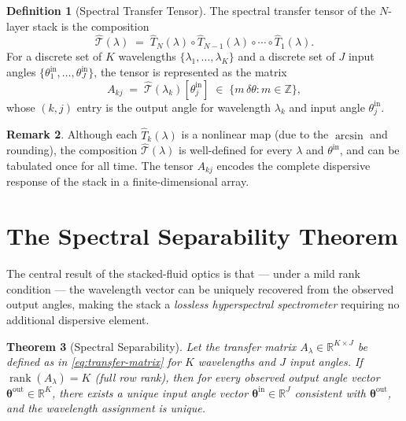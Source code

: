 \documentclass[11pt,twocolumn,a4paper]{article}
\theoremstyle{plain}
\newtheorem{theorem}{Theorem}[section]
\theoremstyle{definition}
\newtheorem{definition}[theorem]{Definition}
\newtheorem{remark}[theorem]{Remark}
\theoremstyle{remark}
\DeclareMathOperator{\rank}{rank}
\newcommand{\R}{\mathbb{R}}
\newcommand{\Z}{\mathbb{Z}}
\begin{document}
\begin{definition}[Spectral Transfer Tensor]
\label{def:transfer-tensor}
The spectral transfer tensor of the $N$-layer stack is the composition
\begin{equation}
\label{eq:transfer-tensor}
  \hat{\mathcal{T}}(\lambda) \;=\; \hat{T}_N(\lambda)\circ\hat{T}_{N-1}(\lambda)\circ\cdots\circ\hat{T}_1(\lambda).
\end{equation}
For a discrete set of $K$ wavelengths $\{\lambda_1,\ldots,\lambda_K\}$ and a discrete set of $J$ input angles $\{\theta_1^\text{in},\ldots,\theta_J^\text{in}\}$, the tensor is represented as the matrix
\begin{equation}
\label{eq:transfer-matrix}
  A_{kj} \;=\; \hat{\mathcal{T}}(\lambda_k)[\theta_j^\text{in}] \;\in\; \{m\,\delta\theta : m\in\Z\},
\end{equation}
whose $(k,j)$ entry is the output angle for wavelength $\lambda_k$ and input angle $\theta_j^\text{in}$.
\end{definition}

\begin{remark}
Although each $\hat{T}_k(\lambda)$ is a nonlinear map (due to the $\arcsin$ and rounding), the composition $\hat{\mathcal{T}}(\lambda)$ is well-defined for every $\lambda$ and $\theta^\text{in}$, and can be tabulated once for all time. The tensor $A_{kj}$ encodes the complete dispersive response of the stack in a finite-dimensional array.
\end{remark}

\section{The Spectral Separability Theorem}
\label{sec:separability}

The central result of the stacked-fluid optics is that — under a mild rank condition — the wavelength vector can be uniquely recovered from the observed output angles, making the stack a \emph{lossless hyperspectral spectrometer} requiring no additional dispersive element.

\begin{theorem}[Spectral Separability]
\label{thm:separability}
Let the transfer matrix $A_\lambda\in\R^{K\times J}$ be defined as in \eqref{eq:transfer-matrix} for $K$ wavelengths and $J$ input angles. If $\rank(A_\lambda)=K$ (full row rank), then for every observed output angle vector $\bm{\theta}^\text{out}\in\R^K$, there exists a unique input angle vector $\bm{\theta}^\text{in}\in\R^J$ consistent with $\bm{\theta}^\text{out}$, and the wavelength assignment is unique.
\end{theorem}
\end{document}
